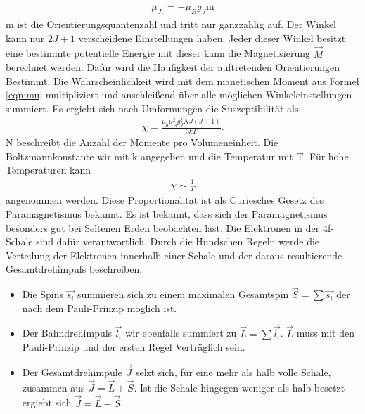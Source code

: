 \begin{align}
  \mu_{J_z}=-\mu_Bg_J\text{m}
  \label{eqn:mu}
\end{align}
m ist die Orientierungsquantenzahl und tritt nur ganzzahlig auf.
Der Winkel kann nur $2J+1$ verscheidene Einstellungen haben.
Jeder dieser Winkel besitzt eine bestimmte potentielle Energie mit dieser kann die Magnetisierung $\vec{M}$ berechnet werden.
Dafür wird die Häufigkeit der auftretenden Orientierungen Bestimmt. Die Wahrscheinlichkeit wird mit dem manetischen Moment aus Formel \ref{eqn:mu} multipliziert und anschleißend über alle möglichen Winkeleinstellungen summiert.
Es ergiebt sich nach Umformungen die Suszeptibilität als:
\begin{align}
  \chi=\frac{\mu_0\mu^2_Bg^2_JNJ(J+1)}{3kT}.
  \label{eqn:suszT}
\end{align}
N beschreibt die Anzahl der Momente pro Volumeneinheit. Die Boltzmannkonstante wir mit k angegeben und die Temperatur mit T.
Für hohe Temperaturen kann
\begin{align*}
  \chi\sim\frac{1}{T}
\end{align*}
angenommen werden. Diese Proportionalität ist als Curiesches Gesetz des Paramagnetismus bekannt.
Es ist bekannt, dass sich der Paramagnetismus besonders gut bei Seltenen Erden beobachten läst.
Die Elektronen in der 4f-Schale sind dafür verantwortlich. Durch die Hundschen Regeln werde die Verteilung der Elektronen innerhalb einer Schale und der daraus resultierende Gesamtdrehimpuls beschreiben.
\begin{itemize}
  \item Die Spins $\vec{s_i}$ summieren sich zu einem maximalen Gesamtspin $\vec{S}=\sum\vec{s_i}$ der nach dem Pauli-Prinzip möglich ist.
  \item Der Bahndrehimpuls $\vec{l_i}$ wir ebenfalls summiert zu $\vec{L}=\sum\vec{l_i}$. $\vec{L}$ muss mit den Pauli-Prinzip und der ersten Regel Verträglich sein.
  \item Der Gesamtdrehimpule $\vec{J}$ selzt sich, für eine mehr als halb volle Schale, zusammen aus $\vec{J}=\vec{L}+\vec{S}$. Ist die Schale hingegen weniger als halb besetzt ergiebt sich $\vec{J}=\vec{L}-\vec{S}$.
\end{itemize}


